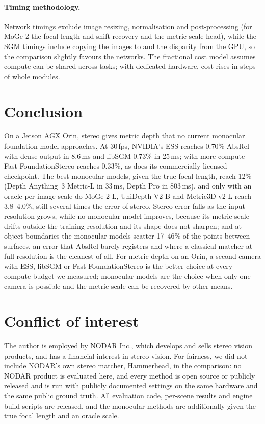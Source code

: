 \documentclass[10pt,twocolumn]{article}
\begin{document}
\paragraph{Timing methodology.} Network timings exclude image resizing, normalisation and
post-processing (for MoGe-2 the focal-length and shift recovery and the metric-scale head), while
the SGM timings include copying the images to and the disparity from the GPU, so the comparison
slightly favours the networks. The fractional cost model assumes compute can be shared across tasks; with dedicated
hardware, cost rises in steps of whole modules.

\section{Conclusion}
On a Jetson AGX Orin, stereo gives metric depth that no current monocular foundation model approaches.
At 30\,fps, NVIDIA's ESS reaches 0.70\% AbsRel with dense output in 8.6\,ms and libSGM 0.73\% in
25\,ms; with more compute Fast-FoundationStereo reaches 0.33\%, as does its commercially licensed
checkpoint. The best
monocular models, given the true focal length, reach 12\% (Depth Anything~3 Metric-L in 33\,ms, Depth
Pro in 803\,ms), and only with an oracle per-image scale do MoGe-2-L, UniDepth V2-B and Metric3D v2-L
reach 3.8--4.0\%, still several times the error of stereo. Stereo error falls as the input resolution
grows, while no monocular model improves, because its metric scale drifts outside the training
resolution and its shape does not sharpen; and at object boundaries the monocular models scatter
17--46\% of the points between surfaces, an error that AbsRel barely registers and where a classical
matcher at full resolution is the cleanest of all. For metric depth on an Orin, a second camera with
ESS, libSGM or Fast-FoundationStereo is the better choice at every compute budget we measured;
monocular models are the choice when only one camera is possible and the metric scale can be recovered
by other means.

\section*{Conflict of interest}
The author is employed by NODAR Inc., which develops and sells stereo vision products, and has a
financial interest in stereo vision. For fairness, we did not include NODAR's own stereo matcher,
Hammerhead, in the comparison: no NODAR product is evaluated here, and every method is open source or
publicly released and is run with publicly documented settings on the same hardware and the same
public ground truth. All evaluation code, per-scene results and engine build scripts are released, and
the monocular methods are additionally given the true focal length and an oracle scale.
\end{document}
